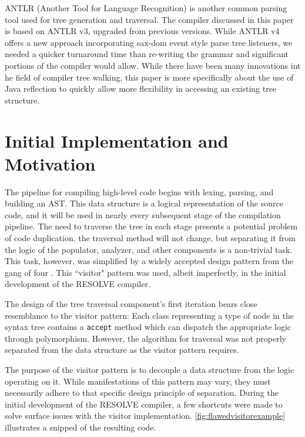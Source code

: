 \documentclass[times]{speauth}
\begin{document}
ANTLR (Another Tool for Language Recognition) is another common parsing tool used for tree generation and traversal. The compiler discussed in this paper is based on ANTLR v3, upgraded from previous versions. While ANTLR v4 offers a new approach incorporating sax-dom event style parse tree listeners, we needed a quicker turnaround time than re-writing the grammar and significant portions of the compiler would allow. While there have been many innovations int he field of compiler tree walking, this paper is more specifically about the use of Java reflection to quickly allow more flexibility in accessing an existing tree structure.


\section{Initial Implementation and Motivation}
The pipeline for compiling high-level code begins with lexing, parsing, and building an AST. This data structure is a logical representation of the source code, and it will be used in nearly every subsequent stage of the compilation pipeline. The need to traverse the tree in each stage presents a potential problem of code duplication. the traversal method will not change, but separating it from the logic of the populator, analyzer, and other components is a non-trivial task. This task, however, was simplified by a widely accepted design pattern from the gang of four \cite{gamma:1995}. This ``visitor" pattern was used, albeit imperfectly, in the initial development of the RESOLVE compiler.

The design of the tree traversal component's first iteration bears close resemblance to the visitor pattern: Each class representing a type of node in the syntax tree contains a \texttt{accept} method which can dispatch the appropriate logic through polymorphism. However, the algorithm for traversal was not properly separated from the data structure as the visitor pattern requires.

The purpose of the visitor pattern is to decouple a data structure from the logic operating on it. While manifestations of this pattern may vary, they must necessarily adhere to that specific design principle of separation. During the initial development of the RESOLVE compiler, a few shortcuts were made to solve surface issues with the visitor implementation. \ref{fig:flawedvisitorexample} illustrates a snipped of the resulting code.
\end{document}
